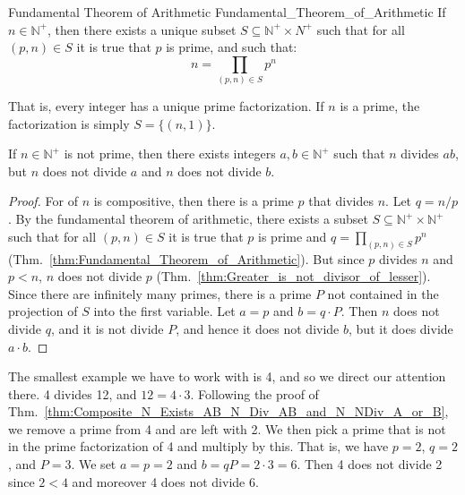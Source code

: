 \documentclass{article}                                                        %
\begin{document}
            \begin{ftheorem}{Fundamental Theorem of Arithmetic}
                            {Fundamental_Theorem_of_Arithmetic}
                If $n\in\mathbb{N}^{+}$, then there exists a unique subset
                $S\subseteq\mathbb{N}^{+}\times{N}^{+}$ such that for all
                $(p,n)\in{S}$ it is true that $p$ is prime, and such that:
                \begin{equation*}
                    n=\prod_{(p,n)\in{S}}p^{n}
                \end{equation*}
            \end{ftheorem}
            That is, every integer has a unique prime factorization. If $n$ is a
            prime, the factorization is simply $S=\{(n,1)\}$.
            \begin{theorem}
                \label{thm:Composite_N_Exists_AB_N_Div_AB_and_N_NDiv_A_or_B}%
                If $n\in\mathbb{N}^{+}$ is not prime, then there exists
                integers $a,b\in\mathbb{N}^{+}$ such that $n$ divides
                $ab$, but $n$ does not divide $a$ and $n$ does not divide $b$.
            \end{theorem}
            \begin{proof}
                For of $n$ is compositive, then there is a prime $p$ that divides
                $n$. Let $q=n/p$. By the fundamental theorem of arithmetic, there
                exists a subset $S\subseteq\mathbb{N}^{+}\times\mathbb{N}^{+}$ such
                that for all $(p,n)\in{S}$ it is true that $p$ is prime and
                $q=\prod_{(p,n)\in{S}}p^{n}$
                (Thm.~\ref{thm:Fundamental_Theorem_of_Arithmetic}). But since
                $p$ divides $n$ and $p<n$, $n$ does not divide $p$
                (Thm.~\ref{thm:Greater_is_not_divisor_of_lesser}). Since there are
                infinitely many primes, there is a prime $P$ not contained in the
                projection of $S$ into the first variable. Let
                $a=p$ and $b=q\cdot{P}$. Then $n$ does not divide $q$, and it is
                not divide $P$, and hence it does not divide $b$, but it does divide
                $a\cdot{b}$.
            \end{proof}
            \begin{example}
                The smallest example we have to work with is 4, and so we direct
                our attention there. 4 divides 12, and $12=4\cdot{3}$. Following the
                proof of
                Thm.~\ref{thm:Composite_N_Exists_AB_N_Div_AB_and_N_NDiv_A_or_B}, we
                remove a prime from 4 and are left with 2. We then pick a prime that
                is not in the prime factorization of 4 and multiply by this. That
                is, we have $p=2$, $q=2$, and $P=3$. We set $a=p=2$ and
                $b=qP=2\cdot{3}=6$. Then 4 does not divide 2 since $2<4$ and
                moreover 4 does not divide 6.
            \end{example}
\end{document}
